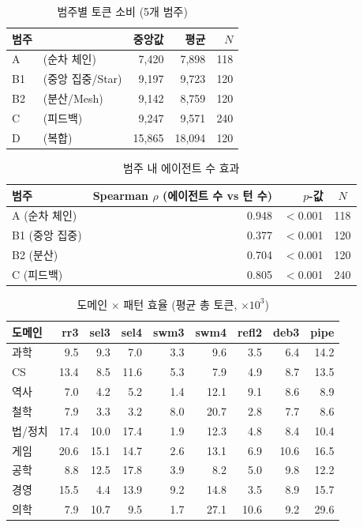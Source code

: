 \documentclass[a4paper,11pt]{article}
\begin{document}
\begin{table}[H]
\centering
\caption{범주별 토큰 소비 (5개 범주)}
\label{tab:cat-token-summary}
{\small
\begin{tabular}{llrrr}
\toprule
범주 & & 중앙값 & 평균 & $N$ \\
\midrule
A  & (순차 체인)    & 7,420  & 7,898  & 118 \\
B1 & (중앙 집중/Star) & 9,197  & 9,723  & 120 \\
B2 & (분산/Mesh)     & 9,142  & 8,759  & 120 \\
C  & (피드백)        & 9,247  & 9,571  & 240 \\
D  & (복합)          & 15,865 & 18,094 & 120 \\
\bottomrule
\end{tabular}
}
\end{table}

\begin{table}[H]
\centering
\caption{범주 내 에이전트 수 효과}
\label{tab:spearman-agents}
{\small
\begin{tabular}{lrrc}
\toprule
범주 & Spearman $\rho$ (에이전트 수 vs 턴 수) & $p$-값 & $N$ \\
\midrule
A (순차 체인)  & 0.948 & $<$0.001 & 118 \\
B1 (중앙 집중) & 0.377 & $<$0.001 & 120 \\
B2 (분산)      & 0.704 & $<$0.001 & 120 \\
C (피드백)     & 0.805 & $<$0.001 & 240 \\
\bottomrule
\end{tabular}
}
\end{table}

\begin{table}[H]
\centering
\caption{도메인 $\times$ 패턴 효율 (평균 총 토큰, $\times 10^{3}$)}
\label{tab:domain-pattern}
{\footnotesize
\begin{tabular}{lrrrrrrrr}
\toprule
도메인 & rr3 & sel3 & sel4 & swm3 & swm4 & refl2 & deb3 & pipe \\
\midrule
과학     & 9.5  & 9.3  & 7.0  & 3.3  & 9.6  & 3.5  & 6.4  & 14.2 \\
CS       & 13.4 & 8.5  & 11.6 & 5.3  & 7.9  & 4.9  & 8.7  & 13.5 \\
역사     & 7.0  & 4.2  & 5.2  & 1.4  & 12.1 & 9.1  & 8.6  & 8.9  \\
철학     & 7.9  & 3.3  & 3.2  & 8.0  & 20.7 & 2.8  & 7.7  & 8.6  \\
법/정치  & 17.4 & 10.0 & 17.4 & 1.9  & 12.3 & 4.8  & 8.4  & 10.4 \\
게임     & 20.6 & 15.1 & 14.7 & 2.6  & 13.1 & 6.9  & 10.6 & 16.5 \\
공학     & 8.8  & 12.5 & 17.8 & 3.9  & 8.2  & 5.0  & 9.8  & 12.2 \\
경영     & 15.5 & 4.4  & 13.9 & 9.2  & 14.8 & 3.5  & 8.9  & 15.7 \\
의학     & 7.9  & 10.7 & 9.5  & 1.7  & 27.1 & 10.6 & 9.2  & 29.6 \\
\bottomrule
\end{tabular}
}
\end{table}
\end{document}
